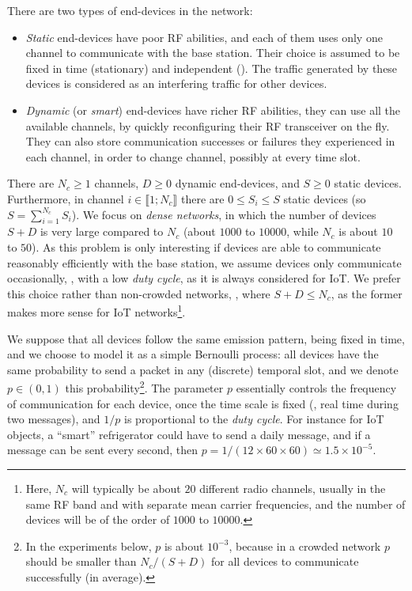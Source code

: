 There are two types of end-devices in the network:
\begin{itemize}
    \item
    \emph{Static} end-devices have poor RF abilities, and each of them uses only one channel to communicate with the base station. Their choice is assumed to be fixed in time (stationary) and independent (\iid). The traffic generated by these devices is considered as an interfering traffic for other devices.
    \item
    \emph{Dynamic} (or \emph{smart}) end-devices have richer RF abilities, they can use all the available channels, by quickly reconfiguring their RF transceiver on the fly. They can also store communication successes or failures they experienced in each channel, in order to change channel, possibly at every time slot.
\end{itemize}

There are $N_c \geq 1$ channels, $D \geq 0$ dynamic end-devices, and $S \geq 0$ static devices.
Furthermore, in channel $i \in \llbracket 1; N_c \rrbracket$ there are $0 \leq S_i \leq S$ static devices (so $S = \sum_{i=1}^{N_c} S_i$).
We focus on \emph{dense networks}, in which the number of devices $S + D$ is very large compared to $N_c$ (about $1000$ to $10000$, while $N_c$ is about $10$ to $50$).
As this problem is only interesting if devices are able to communicate reasonably efficiently with the base station, we assume devices only communicate occasionally, \ie, with a low \emph{duty cycle}, as it is always considered for IoT.
We prefer this choice rather than non-crowded networks, \ie, where $S + D \leq N_c$, as the former makes more sense for IoT networks\footnote{Here, $N_c$ will typically be about $20$ different radio channels, usually in the same RF band and with separate mean carrier frequencies, and the number of devices will be of the order of $1000$ to $10000$.}.

We suppose that all devices follow the same emission pattern, being fixed in time, and we choose to model it as a simple Bernoulli process:
all devices have the same probability to send a packet in any (discrete) temporal slot, and we denote $p \in (0, 1)$ this probability\footnote{In the experiments below, $p$ is about $10^{-3}$, because in a crowded network $p$ should be smaller than $N_c / (S + D)$ for all devices to communicate successfully (in average).}.
The parameter $p$ essentially controls the frequency of communication for each device, once the time scale is fixed (\ie, real time during two messages), and $1/p$ is proportional to the \emph{duty cycle}.
For instance for IoT objects, a ``smart'' refrigerator could have to send a daily message, and if a message can be sent every second, then $p = 1 / (12 \times 60 \times 60) \simeq 1.5 \times 10^{-5}$.


